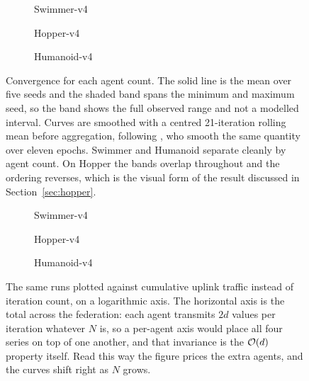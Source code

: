 \begin{figure}[t]
  \centering
  \begin{subfigure}[b]{0.49\textwidth}
    
    \caption{Swimmer-v4}
  \end{subfigure}
  \hfill
  \begin{subfigure}[b]{0.49\textwidth}
    
    \caption{Hopper-v4}
  \end{subfigure}

  \vspace{0.6em}
  \begin{subfigure}[b]{0.49\textwidth}
    
    \caption{Humanoid-v4}
  \end{subfigure}
  \caption{Convergence for each agent count. The solid line is the mean over five
  seeds and the shaded band spans the minimum and maximum seed, so the band
  shows the full observed range and not a modelled interval. Curves are
  smoothed with a centred 21-iteration rolling mean before aggregation,
  following \citet{spinningup}, who smooth the same quantity over eleven
  epochs. Swimmer and Humanoid separate cleanly by agent count. On Hopper the
  bands overlap throughout and the ordering reverses, which is the visual form
  of the result discussed in Section~\ref{sec:hopper}.}
  \label{fig:convergence}
\end{figure}

\begin{figure}[t]
  \centering
  \begin{subfigure}[b]{0.49\textwidth}
    
    \caption{Swimmer-v4}
  \end{subfigure}
  \hfill
  \begin{subfigure}[b]{0.49\textwidth}
    
    \caption{Hopper-v4}
  \end{subfigure}

  \vspace{0.6em}
  \begin{subfigure}[b]{0.49\textwidth}
    
    \caption{Humanoid-v4}
  \end{subfigure}
  \caption{The same runs plotted against cumulative uplink traffic instead of
  iteration count, on a logarithmic axis. The horizontal axis is the total
  across the federation: each agent transmits $2d$ values per iteration
  whatever $N$ is, so a per-agent axis would place all four series on top of
  one another, and that invariance is the $\mathcal{O}(d)$ property itself. Read this
  way the figure prices the extra agents, and the curves shift right as $N$
  grows.}
  \label{fig:communication}
\end{figure}

